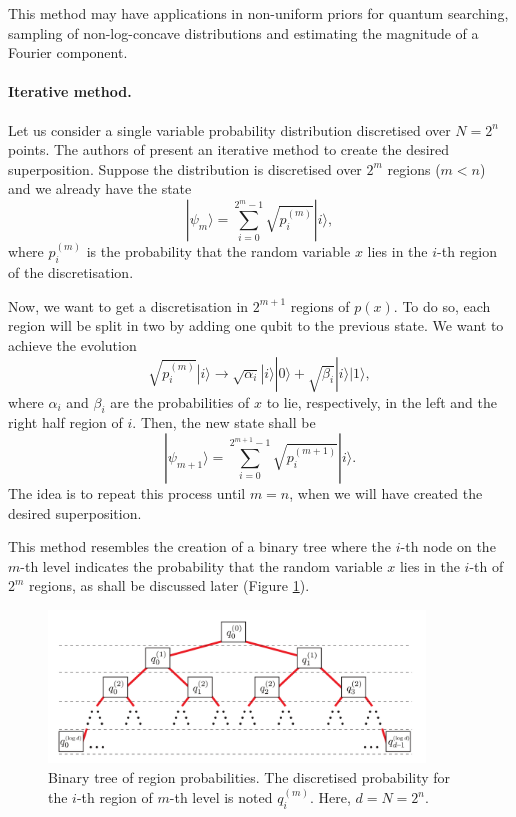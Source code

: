 \documentclass[a4paper, 10pt]{article}
\numberwithin{equation}{section}
\numberwithin{figure}{section}
\numberwithin{table}{section}
\begin{document}
This method may have applications in non-uniform priors for quantum searching, sampling of non-log-concave distributions and estimating the magnitude of a Fourier component.

\paragraph{Iterative method.}
Let us consider a single variable probability distribution discretised over $N=2^n$ points. The authors of \cite{griffighs} present an iterative method to create the desired superposition. Suppose the distribution is discretised over $2^m$ regions ($m<n$) and we already have the state
\begin{equation}
	|\psi_m\rangle = \sum_{i=0}^{2^m-1}\sqrt{p_i^{(m)}}|i\rangle,
\end{equation}
where $p_i^{(m)}$ is the probability that the random variable $x$ lies in the $i$-th region of the discretisation.

Now, we want to get a discretisation in $2^{m+1}$ regions of $p(x)$. To do so, each region will be split in two by adding one qubit to the previous state. We want to achieve the evolution
\begin{equation} \label{eq:evo}
	\sqrt{p_i^{(m)}}|i\rangle \rightarrow \sqrt{\alpha_i}|i\rangle|0\rangle + \sqrt{\beta_i}|i\rangle|1\rangle,
\end{equation}
where $\alpha_i$ and $\beta_i$ are the probabilities of $x$ to lie, respectively, in the left and the right half region of $i$. Then, the new state shall be
\begin{equation}
	|\psi_{m+1}\rangle = \sum_{i=0}^{2^{m+1}-1}\sqrt{p_i^{({m+1})}}|i\rangle.
\end{equation}
The idea is to repeat this process until $m=n$, when we will have created the desired superposition.

This method resembles the creation of a binary tree where the $i$-th node on the $m$-th level indicates the probability that the random variable $x$ lies in the $i$-th of $2^m$ regions, as shall be discussed later (Figure \ref{fig:binary-tree}).

\begin{figure}[h!]
	\centering
	\label{fig:binary-tree}
	\includegraphics[width=10cm]{Figures/binarytree}
	\caption{Binary tree of region probabilities. The discretised probability for the $i$-th region of $m$-th level is noted $q^{(m)}_i$. Here, $d=N=2^n$.}
\end{figure}
\end{document}

